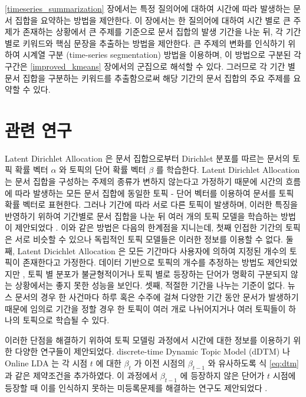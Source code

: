 \documentclass[oneside, ko,phd]{snuthesis_utf8_kor}
\begin{document}
\ref{timeseries_summarization} 장에서는 특정 질의어에 대하여 시간에 따라 발생하는 문서 집합을 요약하는 방법을 제안한다.
이 장에서는 한 질의어에 대하여 시간 별로 큰 주제가 존재하는 상황에서 큰 주제를 기준으로 문서 집합의 발생 기간을 나눈 뒤, 각 기간 별로 키워드와 핵심 문장을 추출하는 방법을 제안한다.
큰 주제의 변화를 인식하기 위하여 시계열 구분 (time-series segmentation) 방법을 이용하며, 이 방법으로 구분된 각 구간은 \ref{improved_kmeans} 장에서의 군집으로 해석할 수 있다.
그러므로 각 기간 별 문서 집합을 구분하는 키워드를 추출함으로써 해당 기간의 문서 집합의 주요 주제를 요약할 수 있다.

\section{관련 연구}

Latent Dirichlet Allocation 은 문서 집합으로부터 Dirichlet 분포를 따르는 문서의 토픽 확률 벡터 $\alpha$ 와 토픽의 단어 확률 벡터 $\beta$ 를 학습한다.
Latent Dirichlet Allocation 는 문서 집합을 구성하는 주제의 종류가 변하지 않는다고 가정하기 때문에 시간의 흐름에 따라 발생하는 모든 문서 집합에 동일한 토픽 - 단어 벡터를 이용하여 문서를 토픽 확률 벡터로 표현한다.
그러나 기간에 따라 서로 다른 토픽이 발생하며, 이러한 특징을 반영하기 위하여 기간별로 문서 집합을 나눈 뒤 여러 개의 토픽 모델을 학습하는 방법이 제안되었다 \cite{blei2006dynamic, mei2007topic, alsumait2008line}.
이와 같은 방법은 다음의 한계점을 지니는데, 첫째 인접한 기간의 토픽은 서로 비슷할 수 있으나 독립적인 토픽 모델들은 이러한 정보를 이용할 수 없다.
둘째, Latent Dicichlet Allocation 은 모든 기간마다 사용자에 의하여 지정된 개수의 토픽이 존재한다고 가정한다. 
데이터 기반으로 토픽의 개수를 추정하는 방법도 제안되었지만 \cite{wang2011online}, 토픽 별 분포가 불균형적이거나 토픽 별로 등장하는 단어가 명확히 구분되지 않는 상황에서는 좋지 못한 성능을 보인다.
셋째, 적절한 기간을 나누는 기준이 없다.
뉴스 문서의 경우 한 사건마다 하루 혹은 수주에 걸쳐 다양한 기간 동안 문서가 발생하기 때문에 임의로 기간을 정할 경우 한 토픽이 여러 개로 나뉘어지거나 여러 토픽들이 하나의 토픽으로 학습될 수 있다.

이러한 단점을 해결하기 위하여 토픽 모델링 과정에서 시간에 대한 정보를 이용하기 위한 다양한 연구들이 제안되었다.
discrete-time Dynamic Topic Model (dDTM) \cite{blei2006dynamic} 나 Online LDA \cite{alsumait2008line} 는 각 시점 $t$ 에 대한 $\beta_t$ 가 이전 시점의 $\beta_{t-1}$ 와 유사하도록 식 \ref{eq:dtm} 과 같은 제약조건을 추가하였다. 이 과정에서 $\beta_{t-1}$ 에 등장하지 않은 단어가 $t$ 시점에 등장할 때 이를 인식하지 못하는 미등록문제를 해결하는 연구도 제안되었다 \cite{zhai2013online}.
\end{document}
